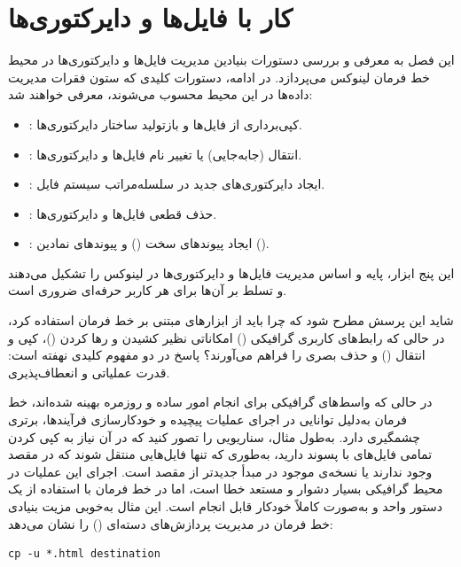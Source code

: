 \chapter{کار با فایل‌ها و دایرکتوری‌ها}

این فصل به معرفی و بررسی دستورات بنیادین مدیریت فایل‌ها و دایرکتوری‌ها در محیط خط فرمان لینوکس می‌پردازد. در ادامه، دستورات کلیدی که ستون فقرات مدیریت داده‌ها در این محیط محسوب می‌شوند، معرفی خواهند شد:

\begin{itemize}
  \item {}: کپی‌برداری از فایل‌ها و بازتولید ساختار دایرکتوری‌ها.
  \item {}: انتقال (جابه‌جایی) یا تغییر نام فایل‌ها و دایرکتوری‌ها.
  \item {}: ایجاد دایرکتوری‌های جدید در سلسله‌مراتب سیستم‌ فایل.
  \item {}: حذف قطعی فایل‌ها و دایرکتوری‌ها.
  \item {}: ایجاد پیوندهای سخت () و پیوندهای نمادین ().
\end{itemize}

این پنج ابزار، پایه و اساس مدیریت فایل‌ها و دایرکتوری‌ها در لینوکس را تشکیل می‌دهند و تسلط بر آن‌ها برای هر کاربر حرفه‌ای ضروری است.

شاید این پرسش مطرح شود که چرا باید از ابزارهای مبتنی بر خط فرمان استفاده کرد، در حالی که رابط‌های کاربری گرافیکی () امکاناتی نظیر کشیدن و رها کردن ()، کپی و انتقال () و حذف بصری را فراهم می‌آورند؟ پاسخ در دو مفهوم کلیدی نهفته است: قدرت عملیاتی و انعطاف‌پذیری.

در حالی که واسط‌های گرافیکی برای انجام امور ساده و روزمره بهینه شده‌اند، خط فرمان به‌دلیل توانایی در اجرای عملیات پیچیده و خودکارسازی فرآیندها، برتری چشمگیری دارد. به‌طول مثال، سناریویی را تصور کنید که در آن نیاز به کپی کردن تمامی فایل‌های با پسوند  دارید، به‌طوری که تنها فایل‌هایی منتقل شوند که در مقصد وجود ندارند یا نسخه‌ی موجود در مبدأ جدیدتر از مقصد است. اجرای این عملیات در محیط گرافیکی بسیار دشوار و مستعد خطا است، اما در خط فرمان با استفاده از یک دستور واحد و به‌صورت کاملاً خودکار قابل انجام است. این مثال به‌خوبی مزیت بنیادی خط فرمان در مدیریت پردازش‌های دسته‌ای () را نشان می‌دهد:

\begin{latin}
\begin{lstlisting}
cp -u *.html destination
\end{lstlisting}
\end{latin}

